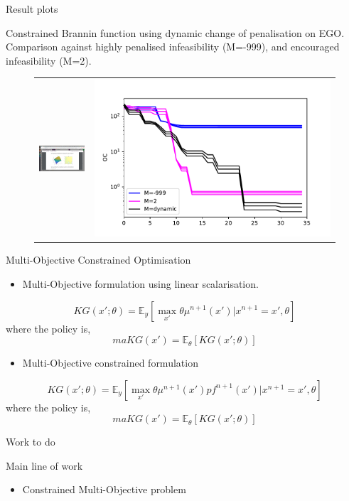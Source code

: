 \documentclass{beamer}
\begin{document}
\begin{frame}{Result plots}

Constrained Brannin function using dynamic change of penalisation on EGO. Comparison against highly penalised infeasibility (M=-999), and encouraged infeasibility (M=2).

\begin{figure}
	
	\centering
	\begin{tabular}{cc}
		\includegraphics[height=2.6cm, trim={450 240 450 360},clip]{New_Branin.png}&
		\includegraphics[width=0.5\linewidth]{penalty_OC.pdf}\\

	\end{tabular}	
\end{figure}

\end{frame}

\begin{frame}{Multi-Objective Constrained Optimisation}

\begin{itemize}
	\item Multi-Objective formulation using linear scalarisation.
\end{itemize}

$$
KG(x';\theta) = \mathbb{E}_{y}[\max_{x'}\theta\mu^{n+1}(x')|x^{n+1}=x',\theta]
$$
where the policy is,
$$
maKG(x') = \mathbb{E}_{\theta}[KG(x';\theta)]
$$

\begin{itemize}
	\item Multi-Objective constrained formulation
\end{itemize}

$$
KG(x';\theta) = \mathbb{E}_{y}[\max_{x'}\theta\mu^{n+1}(x')pf^{n+1}(x')|x^{n+1}=x',\theta]
$$
where the policy is,
$$
maKG(x') = \mathbb{E}_{\theta}[KG(x';\theta)]
$$


\end{frame}






\begin{frame}{Work to do}

Main line of work
\begin{itemize}
	\item Constrained Multi-Objective problem
\end{itemize}

\end{frame}
\end{document}
